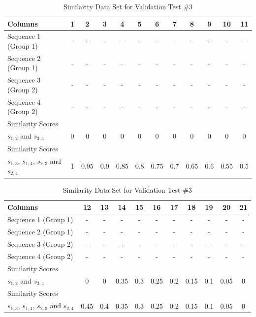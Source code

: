 \begin{table}[htb]
\caption{Similarity Data Set for Validation Test \#3}\label{tab:test_3}\centering\small
\begin{tabular}{lccccccccccc} \toprule
  Columns                     & 1   & 2    & 3   & 4    & 5   & 6    & 7   & 8    & 9   & 10   & 11  \\ \hline
  Sequence 1 (Group 1)        & -   & -    & -   & -    & -   & -    & -   & -    & -   & -    & -   \\
  Sequence 2 (Group 1)        & -   & -    & -   & -    & -   & -    & -   & -    & -   & -    & -   \\
  Sequence 3 (Group 2)        & -   & -    & -   & -    & -   & -    & -   & -    & -   & -    & -   \\
  Sequence 4 (Group 2)        & -   & -    & -   & -    & -   & -    & -   & -    & -   & -    & -   \\
  Similarity Scores \\
  $s_{1,2}$ and $s_{3,4}$     & 0   & 0    & 0   & 0    & 0   & 0    & 0   & 0    & 0   & 0    & 0   \\
  Similarity Scores \\
  $s_{1,3}$, $s_{1,4}$, $s_{2,3}$ and $s_{2,4}$
                              & 1   & 0.95 & 0.9 & 0.85 & 0.8 & 0.75 & 0.7 & 0.65 & 0.6 & 0.55 & 0.5 \\ \bottomrule
\end{tabular}\vspace{4mm}
\begin{tabular}{lcccccccccc} \toprule
  Columns                     & 12   & 13  & 14   & 15  & 16   & 17  & 18   & 19  & 20   & 21 \\ \hline
  Sequence 1 (Group 1)        & -    & -   & -    & -   & -    & -   & -    & -   & -    & -  \\
  Sequence 2 (Group 1)        & -    & -   & -    & -   & -    & -   & -    & -   & -    & -  \\
  Sequence 3 (Group 2)        & -    & -   & -    & -   & -    & -   & -    & -   & -    & -  \\
  Sequence 4 (Group 2)        & -    & -   & -    & -   & -    & -   & -    & -   & -    & -  \\
  Similarity Scores \\
  $s_{1,2}$ and $s_{3,4}$     & 0    & 0   & 0.35 & 0.3 & 0.25 & 0.2 & 0.15 & 0.1 & 0.05 & 0  \\
  Similarity Scores \\
  $s_{1,3}$, $s_{1,4}$, $s_{2,3}$ and $s_{2,4}$
                              & 0.45 & 0.4 & 0.35 & 0.3 & 0.25 & 0.2 & 0.15 & 0.1 & 0.05 & 0  \\ \bottomrule
\end{tabular}
\end{table}

